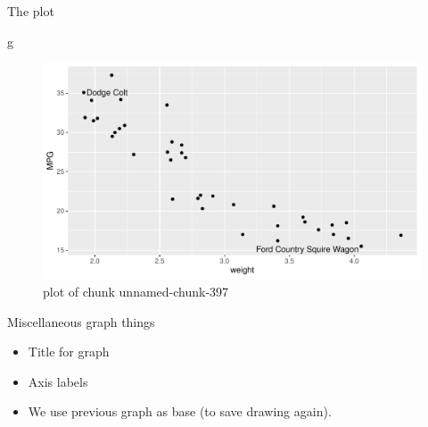 \documentclass[ignorenonframetext,]{beamer}
\newenvironment{Shaded}{\begin{snugshade}}{\end{snugshade}}
\newcommand{\NormalTok}[1]{#1}
\providecommand{\tightlist}{%
  \setlength{\itemsep}{0pt}\setlength{\parskip}{0pt}}
\begin{document}
\begin{frame}[fragile]{The plot}
\protect\hypertarget{the-plot-7}{}

\begin{Shaded}
\begin{Highlighting}[]
\NormalTok{g}
\end{Highlighting}
\end{Shaded}

\begin{figure}
\centering
\includegraphics{figure/unnamed-chunk-397-1.pdf}
\caption{plot of chunk unnamed-chunk-397}
\end{figure}

\end{frame}

\begin{frame}{Miscellaneous graph things}
\protect\hypertarget{miscellaneous-graph-things}{}

\begin{itemize}
\tightlist
\item
  Title for graph
\item
  Axis labels
\item
  We use previous graph as base (to save drawing again).
\end{itemize}

\end{frame}
\end{document}
